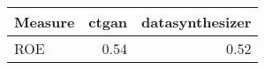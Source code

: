 \begin{tabular}{lrr}
  \toprule
Measure & ctgan & datasynthesizer \\ 
  \midrule
ROE & 0.54 & 0.52 \\ 
   \bottomrule
\end{tabular}
